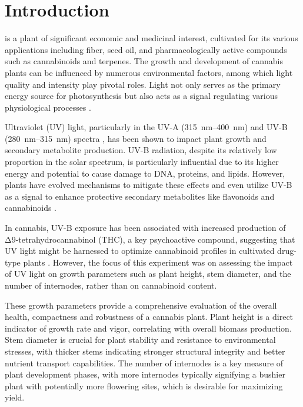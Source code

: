 \section{Introduction}

 is a plant of significant economic and medicinal interest, cultivated for its various applications including fiber, seed oil, and pharmacologically active compounds such as cannabinoids and terpenes. The growth and development of cannabis plants can be influenced by numerous environmental factors, among which light quality and intensity play pivotal roles. Light not only serves as the primary energy source for photosynthesis but also acts as a signal regulating various physiological processes \autocite{eichhorn_bilodeau_update_2019}.

Ultraviolet (UV) light, particularly in the UV-A (\qtyrange[range-phrase=\textendash, range-units=single]{315}{400}{nm}) and UV-B (\qtyrange[range-phrase=\textendash, range-units=single]{280}{315}{nm}) spectra \autocite{international_organization_for_standardization_space_2007}, has been shown to impact plant growth and secondary metabolite production. UV-B radiation, despite its relatively low proportion in the solar spectrum, is particularly influential due to its higher energy and potential to cause damage to DNA, proteins, and lipids. However, plants have evolved mechanisms to mitigate these effects and even utilize UV-B as a signal to enhance protective secondary metabolites like flavonoids and cannabinoids \autocite{eichhorn_bilodeau_update_2019}.

In cannabis, UV-B exposure has been associated with increased production of Δ9-tetrahydrocannabinol (THC), a key psychoactive compound, suggesting that UV light might be harnessed to optimize cannabinoid profiles in cultivated drug-type plants \autocite{eichhorn_bilodeau_update_2019, lydon_uv-b_1987}. However, the focus of this experiment was on assessing the impact of UV light on growth parameters such as plant height, stem diameter, and the number of internodes, rather than on cannabinoid content.

These growth parameters provide a comprehensive evaluation of the overall health, compactness and robustness of a cannabis plant. Plant height is a direct indicator of growth rate and vigor, correlating with overall biomass production. Stem diameter is crucial for plant stability and resistance to environmental stresses, with thicker stems indicating stronger structural integrity and better nutrient transport capabilities. The number of internodes is a key measure of plant development phases, with more internodes typically signifying a bushier plant with potentially more flowering sites, which is desirable for maximizing yield.

